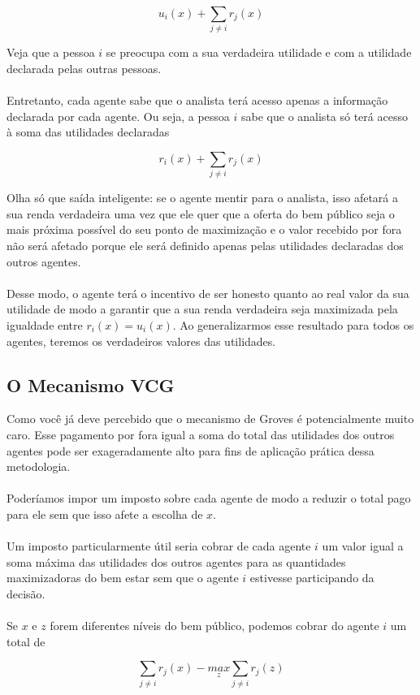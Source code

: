\documentclass[a4paper,11pt,oneside]{book}
\theoremstyle{definition}
\theoremstyle{break}
\begin{document}
$$ u_i(x) + \displaystyle \sum_{j \neq i} r_j(x) $$

Veja que a pessoa $i$ se preocupa com a sua verdadeira utilidade e com a utilidade declarada pelas outras pessoas. 
\\~\\
Entretanto, cada agente sabe que o analista terá acesso apenas a informação declarada por cada agente. Ou seja, a pessoa $i$ sabe que o analista só terá acesso à soma das utilidades declaradas

$$ r_i(x) + \displaystyle \sum_{j \neq i} r_j(x) $$

Olha só que saída inteligente: se o agente mentir para o analista, isso afetará a sua renda verdadeira uma vez que ele quer que a oferta do bem público seja o mais próxima possível do seu ponto de maximização e o valor recebido por fora não será afetado porque ele será definido apenas pelas utilidades declaradas dos outros agentes.
\\~\\
Desse modo, o agente terá o incentivo de ser honesto quanto ao real valor da sua utilidade de modo a garantir que a sua renda verdadeira seja maximizada pela igualdade entre $r_i(x) = u_i(x)$. Ao generalizarmos esse resultado para todos os agentes, teremos os verdadeiros valores das utilidades.

\subsection{O Mecanismo VCG}

Como você já deve percebido que o mecanismo de Groves é potencialmente muito caro. Esse pagamento por fora igual a soma do total das utilidades dos outros agentes pode ser exageradamente alto para fins de aplicação prática dessa metodologia.
\\~\\
Poderíamos impor um imposto sobre cada agente de modo a reduzir o total pago para ele sem que isso afete a escolha de $x$.
\\~\\
Um imposto particularmente útil seria cobrar de cada agente $i$ um valor igual a soma máxima das utilidades dos outros agentes para as quantidades maximizadoras do bem estar sem que o agente $i$ estivesse participando da decisão.
\\~\\
Se $x$ e $z$ forem diferentes níveis do bem público, podemos cobrar do agente $i$ um total de

$$ \displaystyle \sum_{j \neq i} r_j(x) - \underset{z}{max} \sum_{j \neq i} r_j(z) $$
\end{document}

